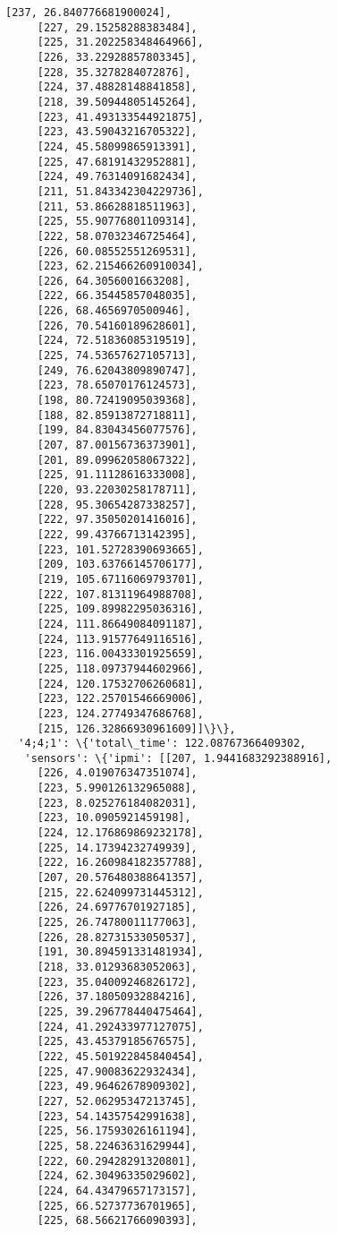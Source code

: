 \documentclass[11pt]{article}
\begin{document}
\begin{tcolorbox}[breakable, size=fbox, boxrule=.5pt, pad at break*=1mm, opacityfill=0]
\begin{Verbatim}[commandchars=\\\{\}]
     [237, 26.840776681900024],
     [227, 29.15258288383484],
     [225, 31.202258348464966],
     [226, 33.22928857803345],
     [228, 35.3278284072876],
     [224, 37.48828148841858],
     [218, 39.50944805145264],
     [223, 41.493133544921875],
     [223, 43.59043216705322],
     [224, 45.58099865913391],
     [225, 47.68191432952881],
     [224, 49.76314091682434],
     [211, 51.843342304229736],
     [211, 53.86628818511963],
     [225, 55.90776801109314],
     [222, 58.07032346725464],
     [226, 60.08552551269531],
     [223, 62.215466260910034],
     [226, 64.3056001663208],
     [222, 66.35445857048035],
     [226, 68.4656970500946],
     [226, 70.54160189628601],
     [224, 72.51836085319519],
     [225, 74.53657627105713],
     [249, 76.62043809890747],
     [223, 78.65070176124573],
     [198, 80.72419095039368],
     [188, 82.85913872718811],
     [199, 84.83043456077576],
     [207, 87.00156736373901],
     [201, 89.09962058067322],
     [225, 91.11128616333008],
     [220, 93.22030258178711],
     [228, 95.30654287338257],
     [222, 97.35050201416016],
     [222, 99.43766713142395],
     [223, 101.52728390693665],
     [209, 103.63766145706177],
     [219, 105.67116069793701],
     [222, 107.81311964988708],
     [225, 109.89982295036316],
     [224, 111.86649084091187],
     [224, 113.91577649116516],
     [223, 116.00433301925659],
     [225, 118.09737944602966],
     [224, 120.17532706260681],
     [223, 122.25701546669006],
     [223, 124.27749347686768],
     [215, 126.32866930961609]]\}\},
  '4;4;1': \{'total\_time': 122.08767366409302,
   'sensors': \{'ipmi': [[207, 1.9441683292388916],
     [226, 4.019076347351074],
     [223, 5.990126132965088],
     [223, 8.025276184082031],
     [223, 10.0905921459198],
     [224, 12.176869869232178],
     [225, 14.17394232749939],
     [222, 16.260984182357788],
     [207, 20.576480388641357],
     [215, 22.624099731445312],
     [226, 24.69776701927185],
     [225, 26.74780011177063],
     [226, 28.82731533050537],
     [191, 30.894591331481934],
     [218, 33.01293683052063],
     [223, 35.04009246826172],
     [226, 37.18050932884216],
     [225, 39.296778440475464],
     [224, 41.292433977127075],
     [225, 43.45379185676575],
     [222, 45.501922845840454],
     [225, 47.90083622932434],
     [223, 49.96462678909302],
     [227, 52.06295347213745],
     [223, 54.14357542991638],
     [225, 56.17593026161194],
     [225, 58.22463631629944],
     [222, 60.29428291320801],
     [224, 62.30496335029602],
     [224, 64.43479657173157],
     [225, 66.52737736701965],
     [225, 68.56621766090393],

\end{Verbatim}
\end{tcolorbox}
\end{document}
